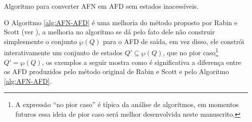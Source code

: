 \begin{algorithm}[h]
	\caption{Algoritmo para converter AFN em AFD sem estados inacessíveis.}
	\label{alg:AFN-AFD}
\end{algorithm}

O Algoritmo \ref{alg:AFN-AFD}  é uma melhoria do método proposto por Rabin e Scott (ver \cite{rabin1959}), a melhoria no algoritmo se dá pelo fato dele não construir simplesmente o conjunto $\wp(Q)$ para o AFD de saída, em vez disso, ele constrói interativamente um conjunto de estados $Q' \subseteq \wp(Q)$, que no pior caso\footnote{A expressão ``no pior caso'' é típica da análise de algoritmos, em momentos futuros essa ideia de pior caso será melhor desenvolvida neste manuscrito.} $Q' = \wp(Q)$, os exemplos a seguir mostra como é significativa a diferença entre os AFD produzidos pelo método original de Rabin e Scott e pelo Algoritmo \ref{alg:AFN-AFD}.

